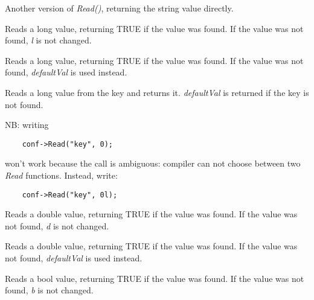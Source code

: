 
Another version of {\it Read()}, returning the string value directly.


Reads a long value, returning TRUE if the value was found. If the value was
not found, {\it l} is not changed.


Reads a long value, returning TRUE if the value was found. If the value was
not found, {\it defaultVal} is used instead.


Reads a long value from the key and returns it. {\it defaultVal} is returned
if the key is not found.

NB: writing

{\small
\begin{verbatim}
    conf->Read("key", 0);
\end{verbatim}
}

won't work because the call is ambiguous: compiler can not choose between two
{\it Read} functions. Instead, write:

{\small
\begin{verbatim}
    conf->Read("key", 0l);
\end{verbatim}
}


Reads a double value, returning TRUE if the value was found. If the value was
not found, {\it d} is not changed.


Reads a double value, returning TRUE if the value was found. If the value was
not found, {\it defaultVal} is used instead.


Reads a bool value, returning TRUE if the value was found. If the value was
not found, {\it b} is not changed.


